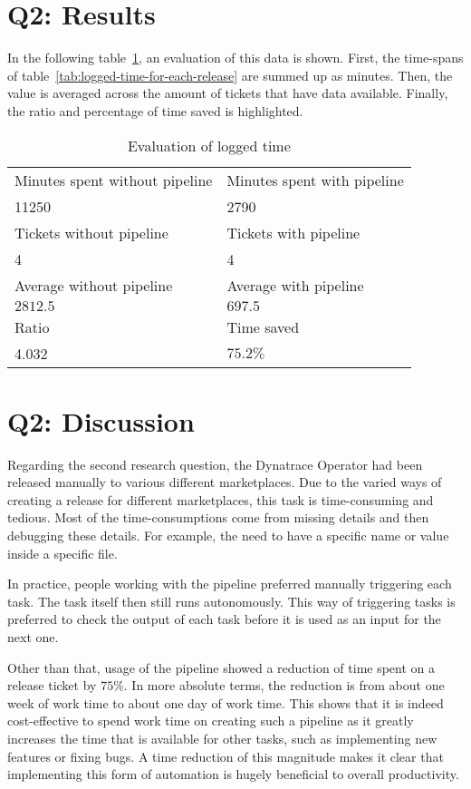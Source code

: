 \section{Q2: Results}\label{sec:q2:-results}

In the following table~\ref{tab:evaluation-of-logged-time}, an evaluation of this data is shown.
First, the time-spans of table~\ref{tab:logged-time-for-each-release} are summed up as minutes.
Then, the value is averaged across the amount of tickets that have data available.
Finally, the ratio and percentage of time saved is highlighted.

\begin{table}[H]
    \centering
    \caption{Evaluation of logged time}
    \label{tab:evaluation-of-logged-time}
    \begin{tabular}{l|l}
        Minutes spent without pipeline & Minutes spent with pipeline \\
        11250 & 2790 \\
        \hline
        Tickets without pipeline & Tickets with pipeline \\
        4 & 4 \\
        \hline
        Average without pipeline & Average with pipeline \\
        $2812.5$ & $697.5$ \\
        \hline
        Ratio & Time saved \\
        4.032 & $75.2 \%$ \\
    \end{tabular}
\end{table}

\section{Q2: Discussion}\label{sec:q2:-discussion}

Regarding the second research question, the Dynatrace Operator had been released manually to various different marketplaces.
Due to the varied ways of creating a release for different marketplaces, this task is time-consuming and tedious.
Most of the time-consumptions come from missing details and then debugging these details.
For example, the need to have a specific name or value inside a specific file.

In practice, people working with the pipeline preferred manually triggering each task.
The task itself then still runs autonomously.
This way of triggering tasks is preferred to check the output of each task before it is used as an input for the next one.

Other than that, usage of the pipeline showed a reduction of time spent on a release ticket by $75 \%$.
In more absolute terms, the reduction is from about one week of work time to about one day of work time.
This shows that it is indeed cost-effective to spend work time on creating such a pipeline as it greatly increases the time that is available for other tasks, such as implementing new features or fixing bugs.
A time reduction of this magnitude makes it clear that implementing this form of automation is hugely beneficial to overall productivity.
